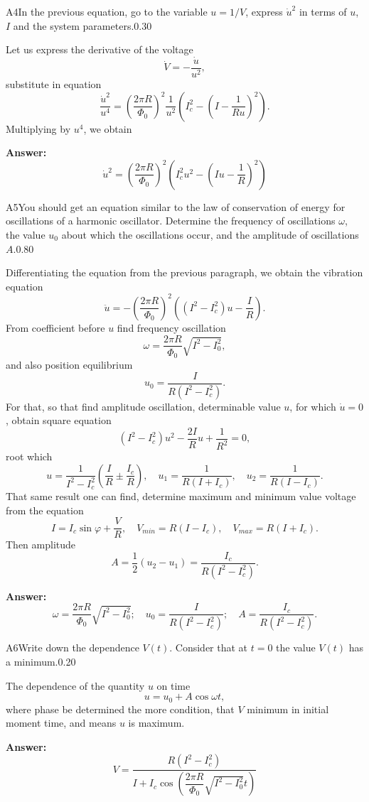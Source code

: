 \documentclass[11pt,a4paper]{article}
\begin{document}
\begin{solcard}{A4}{In the previous equation, go to the variable $u = 1/V$, express $\dot{u}^2$ in terms of $u$, $I$ and the system parameters.}{0.30}

Let us express the derivative of the voltage $$ \dot{V} = - \frac{\dot{u}}{u^2}, $$substitute in equation $$ \frac{\dot{u}^2}{u^4} = \left(\frac{2 \pi R}{\Phi_0} \right)^2 \frac{1}{u^2} \left(I_c^2 -  \left(I - \frac{1}{R u} \right)^2\right). $$Multiplying by $u^4$, we obtain

\par\smallskip\noindent\textbf{Answer:} $$ \dot{u}^2 = \left(\frac{2 \pi R}{\Phi_0} \right)^2\left(I_c^2 u^2 - \left(I u - \frac{1}{R} \right) ^2\right) $$
\end{solcard}

\begin{solcard}{A5}{You should get an equation similar to the law of conservation of energy for oscillations of a harmonic oscillator. Determine the frequency of oscillations $\omega$, the value $u_0$ about which the oscillations occur, and the amplitude of oscillations $A$.}{0.80}

Differentiating the equation from the previous paragraph, we obtain the vibration equation $$ \ddot{u} = -  \left(\frac{2 \pi R}{\Phi_0} \right)^2 \left( (I^2 - I_c^2) u  - \frac{I}{R} \right). $$From coefficient before $u$ find frequency oscillation $$ \omega = \frac{2\pi R}{\Phi_0} \sqrt{I^2 - I_0^2}, $$and also position equilibrium $$ u_0 = \frac{I}{R (I^2 - I_c^2)}. $$For that, so that find amplitude oscillation, determinable value $u$, for which $\dot{u} = 0$, obtain square equation $$ (I^2 -I_c^2)u^2 - \frac{2I}{R} u + \frac{1}{R^2} = 0, $$root which $$ u = \frac{1}{I^2 - I_c^2} \left( \frac{I}{R} \pm \frac{I_c}{R}\right), \quad u_1 = \frac{1}{R(I + I_c)}, \quad u_2 = \frac{1}{R(I-I_c)}. $$That same result one can find, determine maximum and minimum value voltage from the equation $$ I = I_c \sin \varphi + \frac{V}{R}, \quad V_{min} = R(I- I_c), \quad V_{max} = R(I + I_c). $$Then amplitude $$A = \frac{1}{2} (u_2 - u_1) = \frac{I_c}{R(I^2 - I_c^2)}.$$

\par\smallskip\noindent\textbf{Answer:} $$ \omega = \frac{2\pi R}{\Phi_0} \sqrt{I^2 - I_0^2}; \quad u_0 = \frac{I}{R (I^2 - I_c^2)}; \quad A =  \frac{I_c}{R(I^2 - I_c^2)}. $$
\end{solcard}

\begin{solcard}{A6}{Write down the dependence $V(t)$. Consider that at $t = 0$ the value $V(t)$ has a minimum.}{0.20}

The dependence of the quantity $u$ on time $$ u = u_0 + A \cos \omega t, $$where phase be determined the more condition, that $V$ minimum in initial moment time, and means $u$ is maximum.

\par\smallskip\noindent\textbf{Answer:} $$ V = \frac{R(I^2 - I_c^2)}{I + I_c \cos \left(\dfrac{2\pi R}{\Phi_0} \sqrt{I^2 - I_0^2} t \right)} $$
\end{solcard}
\end{document}
